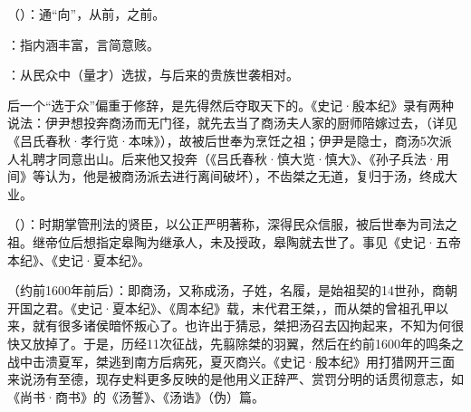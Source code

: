 {
\item {}（）：通“向”，从前，之前。
\item {}：指内涵丰富，言简意赅。
\item {}：从民众中（量才）选拔，与后来的贵族世袭相对。

后一个“选于众”偏重于修辞，是先得然后夺取天下的。《史记·殷本纪》录有两种说法：伊尹想投奔商汤而无门径，就先去当了商汤夫人家的厨师陪嫁过去，（详见《吕氏春秋·孝行览·本味》），故被后世奉为烹饪之祖；伊尹是隐士，商汤5次派人礼聘才同意出山。后来他又投奔（《吕氏春秋·慎大览·慎大》、《孙子兵法·用间》等认为，他是被商汤派去进行离间破坏），不齿桀之无道，复归于汤，终成大业。

\item {}（）：时期掌管刑法的贤臣，以公正严明著称，深得民众信服，被后世奉为司法之祖。继帝位后想指定皋陶为继承人，未及授政，皋陶就去世了。事见《史记·五帝本纪》、《史记·夏本纪》。%

\item {}（约前1600年前后）：即商汤，又称成汤，子姓，名履，是始祖契的14世孙，商朝开国之君。《史记·夏本纪》、《周本纪》载，末代君王桀，，而从桀的曾祖孔甲以来，就有很多诸侯暗怀叛心了。也许出于猜忌，桀把汤召去囚拘起来，不知为何很快又放掉了。于是，历经11次征战，先翦除桀的羽翼，然后在约前1600年的鸣条之战中击溃夏军，桀逃到南方后病死，夏灭商兴。《史记·殷本纪》用打猎网开三面来说汤有至德，现存史料更多反映的是他用义正辞严、赏罚分明的话贯彻意志，如《尚书·商书》的《汤誓》、《汤诰》（伪）篇。

}
